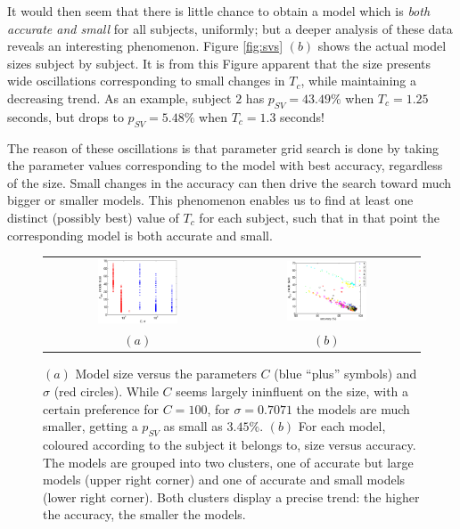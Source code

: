 \documentclass{article}
\begin{document}
It would then seem that there is little chance to obtain a model which
is \emph{both accurate and small} for all subjects, uniformly; but a
deeper analysis of these data reveals an interesting
phenomenon. Figure \ref{fig:svs} $(b)$ shows the actual model sizes
subject by subject. It is from this Figure apparent that the size
presents wide oscillations corresponding to small changes in $T_c$,
while maintaining a decreasing trend. As an example, subject $2$ has
$p_{SV}=43.49\%$ when $T_c=1.25$ seconds, but drops to $p_{SV}=5.48\%$
when $T_c=1.3$ seconds!

The reason of these oscillations is that parameter grid search is done
by taking the parameter values corresponding to the model with best
accuracy, regardless of the size. Small changes in the accuracy can
then drive the search toward much bigger or smaller models. This
phenomenon enables us to find at least one distinct (possibly best)
value of $T_c$ for each subject, such that in that point the
corresponding model is both accurate and small.

\begin{figure}[!t]
  \centering
    \begin{tabular}{cc}
      \includegraphics[width=0.45\textwidth]{svs_params.eps} &
      \includegraphics[width=0.45\textwidth]{acc_svs.eps} \\
      $(a)$ & $(b)$
    \end{tabular}
    \caption{$(a)$ Model size versus the parameters $C$ (blue ``plus''
    symbols) and $\sigma$ (red circles). While $C$ seems largely
    ininfluent on the size, with a certain preference for $C=100$, for
    $\sigma=0.7071$ the models are much smaller, getting a $p_{SV}$ as
    small as $3.45\%$. $(b)$ For each model, coloured according to the
    subject it belongs to, size versus accuracy. The models are
    grouped into two clusters, one of accurate but large models (upper
    right corner) and one of accurate and small models (lower right
    corner). Both clusters display a precise trend: the higher the
    accuracy, the smaller the models.}
    \label{fig:svs_params}
\end{figure}
\end{document}
